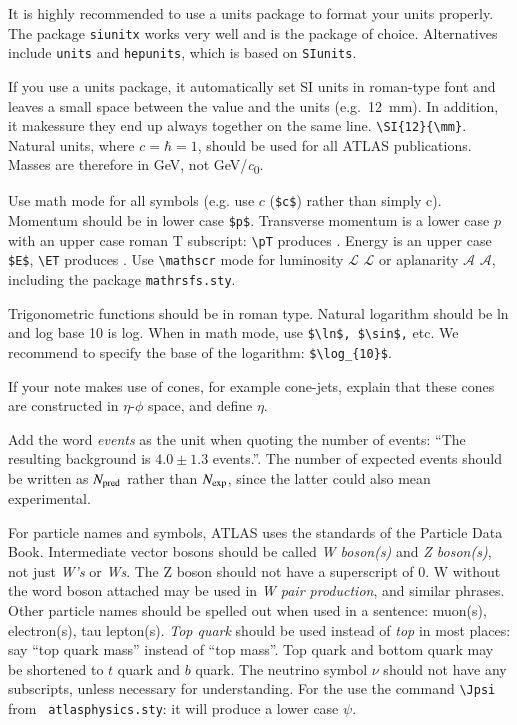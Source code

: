 \documentclass[UKenglish]{style/atlasdoc}
\begin{document}
It is highly recommended to use a units package to format your units properly.
The package \texttt{siunitx} works very well and is the package of choice.
Alternatives include \texttt{units} and \texttt{hepunits},
which is based on \texttt{SIunits}.

If you use a units package, it automatically set SI units in roman-type font
and leaves a small space between
the value and the units (e.g.\ \SI{12}{\mm}). 
In addition, it makessure they end up
always together on the same line. \verb|\SI{12}{\mm}|.
Natural units, where $c=\hbar=1$, should be used for all
ATLAS publications. Masses are therefore in \si{\GeV}, not \si[per-mode=symbol]{\GeV\per\clight}.

Use math mode for all symbols (e.g. use $c$ (\verb|$c$|) rather than simply c). 
Momentum should be in lower case \verb+$p$+. 
Transverse momentum is a lower case $p$ with an upper case roman $\text{T}$ subscript: 
\verb|\pT| produces \pT.
Energy is an upper case \verb+$E$+, \verb+\ET+ produces \ET.  
Use \verb|\mathscr| mode for luminosity $\mathscr{L}$ $\mathcal{L}$ or aplanarity
$\mathscr{A}$ $\mathcal{A}$, including the package \verb|mathrsfs.sty|.

Trigonometric functions should be in roman type. Natural logarithm
should be ln and log base 10 is log.  When in math mode, use
\verb+$\ln$, $\sin$,+ etc. We recommend to specify the base of the
logarithm: \verb+$\log_{10}$+.

If your note makes use of cones, for example cone-jets, explain that
these cones are constructed in $\eta$-$\phi$ space, and define $\eta$.

Add the word \emph{events} as the unit when quoting the number of
events: ``The resulting background is $4.0 \pm 1.3$ events.''.  The
number of expected events should be written as $N_{\rm pred}$ rather
than $N_{\rm exp}$, since the latter could also mean experimental.

For particle names and symbols, ATLAS uses the standards of the
Particle Data Book. Intermediate vector bosons should be called
\emph{W boson(s)} and \emph{Z boson(s)}, not just \emph{W's} or
\emph{Ws}. The Z boson should not have a superscript of 0. W without
the word boson attached may be used in \emph{W pair production}, and
similar phrases.  Other particle names should be spelled out when used
in a sentence: muon(s), electron(s), tau lepton(s). \emph{Top quark}
should be used instead of \emph{top} in most places: say ``top quark
mass'' instead of ``top mass''.  Top quark and bottom quark may be
shortened to $t$ quark and $b$ quark. The neutrino
symbol $\nu$ should not have any subscripts, unless necessary for
understanding. For the \Jpsi{} use the command \verb+\Jpsi+ from {\tt
atlasphysics.sty}: it will produce a lower case $\psi$.
\end{document}
